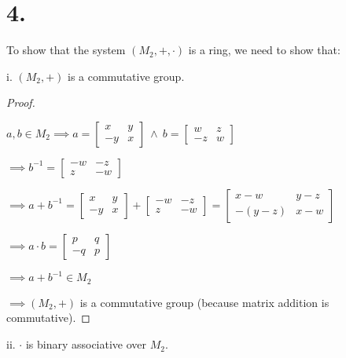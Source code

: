 \documentclass{article}
\begin{document}
\section*{4.}
To show that the system $(M_2, +, \cdot)$ is a ring, we need to show that:

\noindent
i. $(M_2, +)$ is a commutative group.

\begin{proof}
  $ $

  $a, b \in M_2 \implies a = \begin{bmatrix}
    x & y \\
    -y & x
  \end{bmatrix}
  \ \land \ 
  b= \begin{bmatrix}
    w & z \\
    -z & w
  \end{bmatrix}$
  \newline

  $\implies b^{-1} = \begin{bmatrix}
    -w & -z \\
    z & -w
  \end{bmatrix}$
  \newline

  $\implies a + b^{-1} = \begin{bmatrix}
    x & y \\
    -y & x
  \end{bmatrix}
  +
  \begin{bmatrix}
    -w & -z \\
    z & -w
  \end{bmatrix}
  =
  \begin{bmatrix}
    x-w & y-z \\
    -(y-z) & x-w
  \end{bmatrix}
  $
  \newline

  $\implies a \cdot b
  =
  \begin{bmatrix}
    p & q \\
    -q & p
  \end{bmatrix}
  $
  \newline

  $\implies a + b^{-1} \in M_2$
  \newline

  $\implies (M_2, +)$ is a commutative group (because matrix addition is commutative).

\end{proof}

\noindent
ii. $\cdot$ is binary associative over $M_2$.
\end{document}
